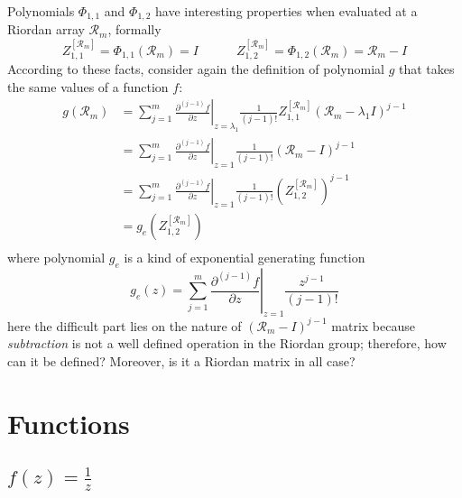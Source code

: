 Polynomials $\Phi_{ 1, 1 }$ and $\Phi_{ 1, 2 }$ have interesting properties
when evaluated at a Riordan array $\mathcal{R}_{m}$, formally
\begin{displaymath}
 Z_{1,1}^{[\mathcal{R}_{m}]} = \Phi_{ 1, 1 }{\left (\mathcal{R}_{m} \right )} = I \quad\quad\quad
 Z_{1,2}^{[\mathcal{R}_{m}]} = \Phi_{ 1, 2 }{\left (\mathcal{R}_{m} \right )} = \mathcal{R}_{m} - I
\end{displaymath}
According to these facts, consider again the definition of polynomial $g$ that takes the same values of a function $f$:
\begin{displaymath}
\begin{split}
    g(\mathcal{R}_{m}) &= \sum_{j=1}^{m}{ \left. \frac{\partial^{(j-1)}{f}}{\partial{z}} \right|_{z=\lambda_{1}}\frac{1}{(j-1)!}{Z_{1,1}^{[\mathcal{R}_{m}]} (\mathcal{R}_{m}-\lambda_{1}I)^{j-1}} }\\
                       &= \sum_{j=1}^{m}{ \left. \frac{\partial^{(j-1)}{f}}{\partial{z}} \right|_{z=1}\frac{1}{(j-1)!}{(\mathcal{R}_{m}-I)^{j-1}} }\\
                       &= \sum_{j=1}^{m}{ \left. \frac{\partial^{(j-1)}{f}}{\partial{z}} \right|_{z=1}\frac{1}{(j-1)!}{\left(Z_{1,2}^{[\mathcal{R}_{m}]}\right)^{j-1}} }\\
                       &= g_{e}\left(Z_{1,2}^{[\mathcal{R}_{m}]}\right)\\
\end{split}
\end{displaymath}
where polynomial $g_{e}$ is a kind of exponential generating function
\begin{displaymath}
    g_{e}\left(z\right) = \sum_{j=1}^{m}{ \left. \frac{\partial^{(j-1)}{f}}{\partial{z}} \right|_{z=1}\frac{z^{j-1}}{(j-1)!}}
\end{displaymath}
here the difficult part lies on the nature of $(\mathcal{R}_{m}-I)^{j-1}$
matrix because \textit{subtraction} is not a well defined operation in the
Riordan group; therefore, how can it be defined?  Moreover, is it a Riordan
matrix in all case?

\section{Functions}

\subsection{$f(z)=\frac{1}{z}$}

